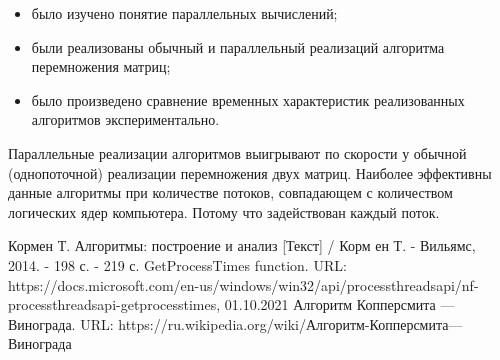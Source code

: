 \documentclass[12pt]{report}
\begin{document}
\begin{itemize}
	\item было изучено понятие параллельных вычислений;
	\item были реализованы обычный и параллельный реализаций алгоритма перемножения матриц;
	\item было произведено сравнение временных характеристик реализованных алгоритмов экспериментально.
\end{itemize}

Параллельные реализации алгоритмов выигрывают по скорости у обычной (однопоточной) реализации перемножения двух матриц. Наиболее эффективны данные алгоритмы при количестве потоков, совпадающем с количеством логических ядер компьютера. Потому что задействован каждый поток.


\newpage
{}
\begin{thebibliography}{}
Кормен Т. Алгоритмы: построение и анализ [Текст] / Корм ен Т. - Вильямс, 2014. - 198 с. - 219 с.
GetProcessTimes function. URL: https://docs.microsoft.com/en-us/windows/win32/api/processthreadsapi/nf-processthreadsapi-getprocesstimes, 01.10.2021
Алгоритм Копперсмита — Винограда. URL: https://ru.wikipedia.org/wiki/Алгоритм-Копперсмита—Винограда
\end{thebibliography}
	
\end{document}
